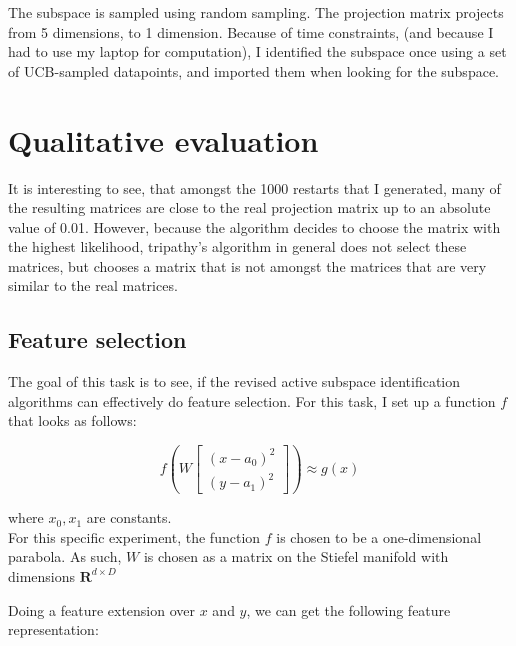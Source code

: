 The subspace is sampled using random sampling.
The projection matrix projects from 5 dimensions, to 1 dimension. 
Because of time constraints, (and because I had to use my laptop for computation), I identified the subspace once using a set of UCB-sampled datapoints, and imported them when looking for the subspace.


\section{Qualitative evaluation}

It is interesting to see, that amongst the 1000 restarts that I generated, many of the resulting matrices are close to the real projection matrix up to an absolute value of 0.01.
However, because the algorithm decides to choose the matrix with the highest likelihood, tripathy's algorithm in general does not select these matrices, but chooses a matrix that is not amongst the matrices that are very similar to the real matrices.

\subsection{Feature selection}
The goal of this task is to see, if the revised active subspace identification algorithms can effectively do feature selection.
For this task, I set up a function $ f $ that looks as follows:

\def\B{
\begin{bmatrix}
    (x - a_0)^2 \\
    (y - a_1)^2
\end{bmatrix}}

\begin{equation} \label{eq:FeatureExtension}
f \left( W \B \right) \approx g \left( x \right)
\end{equation} 

where $x_0, x_1$ are constants. \\

For this specific experiment, the function $f$ is chosen to be a one-dimensional parabola. 
As such, $W$ is chosen as a matrix on the Stiefel manifold with dimensions $\mathbf{R}^{d \times D}$

Doing a feature extension over $x$ and $y$, we can get the following feature representation:

\def\PHI{
\begin{bmatrix}
	x_0^2 \\
	x_1^2 \\
	x_0 \\
	x_1 \\
    1
\end{bmatrix}}


